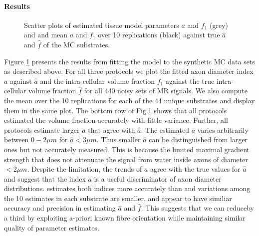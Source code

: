 \paragraph{Results}
\begin{figure}
\centering
  \caption{Scatter plots of estimated tissue model parameters $a$ and $f_1$ (grey) and and mean $a$ and $f_1$ over 10 replications (black) against true $\hat{a}$ and $\hat{f}$ of the MC substrates.}
  \label{fig:mc simulations}
\end{figure}
Figure \ref{fig:mc simulations} presents the results from fitting the model to the synthetic MC data sets as described above. For all three protocols we plot the fitted axon diameter index $a$ against $\hat{a}$
and the intra-cellular volume fraction $f_1$ against the true intra-cellular volume fraction $\hat{f}$ for all 440 noisy sets of MR signals. We also compute the mean over the 10 replications for each of the 44
unique substrates and display them in the same plot. The bottom row of Fig.\ref{fig:mc simulations} shows that all protocols estimated the volume fraction accurately with little variance. Further, all protocols
estimate larger $a$ that agree with $\hat{a}$. The estimated $a$ varies arbitrarily between $0-2\mu m$ for $\hat{a} < 3\mu m$. Thus smaller $\hat{a}$ can be distinguished from larger ones but not accurately
measured. This is because the limited maximal gradient strength that does not attenuate the signal from water inside axons of diameter $<2\mu m$. Despite the limitation, the trends of $a$ agree with the true
values for $\hat{a}$ and suggest that the index $a$ is a useful discriminator of axon diameter distributions. \SFlong{} estimates both indices more accurately than \OIlong{} and variations among the 10
estimates in each substrate are smaller. \SFshort{} and \OIlong{} appear to have similiar accuracy and precision in estimating $\hat{a}$ and $\hat{f}$. This suggests that we can reduceby a third by exploiting
a-priori known fibre orientation while maintaining similar quality of parameter estimates.


